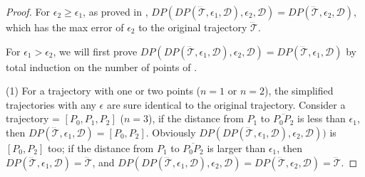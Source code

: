 \begin{proof}
	For $\epsilon_2 \ge \epsilon_1$, as proved in \cite{Cao:Spatio}, $DP(DP(\dddot{\mathcal{T}}, \epsilon_1, \mathcal{D}), \epsilon_2, \mathcal{D}) = DP(\dddot{\mathcal{T}}, \epsilon_2, \mathcal{D})$, which has the max error of $\epsilon_2$ to the original trajectory $\dddot{\mathcal{T}}$.
	
	For $\epsilon_1 > \epsilon_2$, we will first prove $DP(DP(\dddot{\mathcal{T}}, \epsilon_1, \mathcal{D}), \epsilon_2, \mathcal{D}) = DP(\dddot{\mathcal{T}}, \epsilon_1, \mathcal{D})$ by total induction on the number of points of .
	
	(1)  For a trajectory  with one or two points ($n=1$ or $n=2$), the simplified trajectories with any $\epsilon$ are sure identical to the original trajectory. 
	Consider a trajectory  =	$[P_0, P_1, P_2]$ ($n = 3$),
	if the distance from $P_1$ to $\overline{P_0P_2}$ is less than $\epsilon_1$, then $DP(\dddot{\mathcal{T}}, \epsilon_1, \mathcal{D}) = [P_0, P_2]$. Obviously $DP(DP(\dddot{\mathcal{T}}, \epsilon_1, \mathcal{D}), \epsilon_2, \mathcal{D}))$ is $[P_0, P_2]$ too;	 
	if the distance from $P_1$ to $\overline{P_0P_2}$ is larger than $\epsilon_1$, then $DP(\dddot{\mathcal{T}}, \epsilon_1, \mathcal{D})=\dddot{\mathcal{T}}$, and $DP(DP(\dddot{\mathcal{T}}, \epsilon_1, \mathcal{D}), \epsilon_2, \mathcal{D}) = DP(\dddot{\mathcal{T}}, \epsilon_2, \mathcal{D})=\dddot{\mathcal{T}}$.
	

\end{proof}
